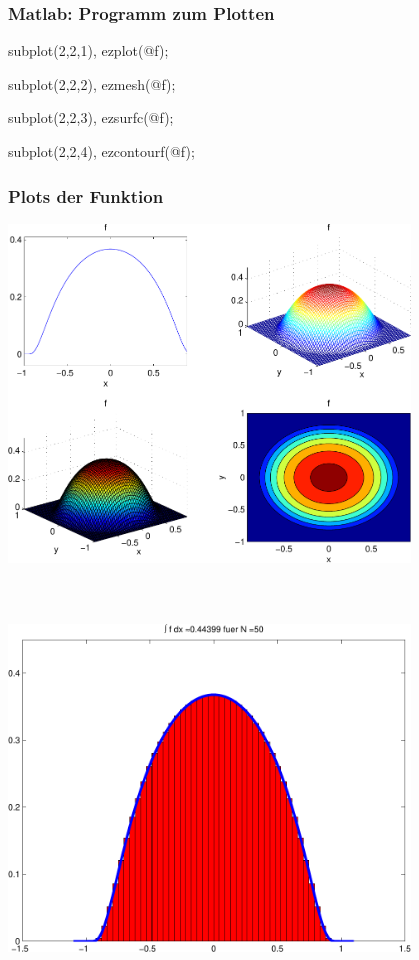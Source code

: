 \documentclass[hyperref={xetex}]{beamer}
\begin{document}
%
%
\begin{frame}[fragile]\frametitle{Matlab: Programm zum Plotten}
\begin{matlabin}
subplot(2,2,1),
ezplot(@f);

subplot(2,2,2),
ezmesh(@f);

subplot(2,2,3),
ezsurfc(@f);

subplot(2,2,4),
ezcontourf(@f);
\end{matlabin}
\end{frame}


\begin{frame}[fragile]\frametitle{Plots der Funktion}
\begin{center}
\includegraphics[width=0.8\textwidth]{./figures/plot_f}  
\end{center}
\end{frame}

% 
% 
\begin{frame}[fragile]\frametitle{}
\centering\alert{ }\\
\begin{center}
\includegraphics[width=0.8\textwidth]{./figures/plot_sobolev} 
\end{center}
\end{frame}
\end{document}
